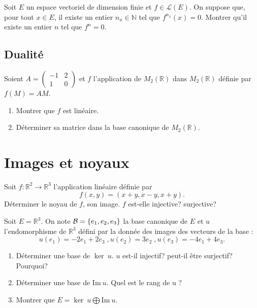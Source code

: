 \documentclass{book}
\begin{document}
\begin{Exercice}
Soit $E$ un espace vectoriel de dimension finie et $f\in\mathcal L(E)$.
On suppose que, pour tout $x\in E$, il existe un entier $n_x\in\mathbb N$ tel
que $f^{n_x}(x)=0.$ Montrer qu'il existe un entier $n$ tel que $f^n=0$.
\end{Exercice}

\subsection{Dualité}
\begin{Exercice}
Soient $A=\left(\begin{array}{cc}-1&2\\1&0\end{array}\right)$
et $f$ l'application de $M_2(\mathbb R)$ dans $M_2(\mathbb R)$
définie par $f(M)=AM$.
\begin{enumerate}
\item Montrer que $f$ est linéaire.
\item Déterminer sa matrice dans la base canonique de $M_2(\mathbb R)$.
\end{enumerate}
\end{Exercice}
\section{Images et noyaux}

\begin{Exercice}
Soit $f:\mathbb R^2\to\mathbb R^3$ l'application linéaire définie par
$$f(x,y)=(x+y,x-y,x+y).$$
Déterminer le noyau de $f$, son image. $f$ est-elle injective? surjective?
\end{Exercice}


\begin{Exercice}
Soit $E=\mathbb R^3$. On note ${\cal B}=\{e_1,e_2,e_3\}$ la base canonique de $E$ et $u$ l'endomorphisme de $\mathbb R^3$ défini par la donnée des images des vecteurs de la base : 
$$u(e_1) = -2e_1 +2e_3 \; , u(e_2)=3e_2 \; , u(e_3)=-4e_1 + 4e_3.$$ 
\begin{enumerate}
\item Déterminer une base de $\ker~u$. 
$u$ est-il injectif? peut-il être surjectif? Pourquoi?
\item Déterminer une base de $\textrm{Im}~u$. Quel est le rang de u ?
\item Montrer que $E=\ker~u\bigoplus \textrm{Im}~u$.
\end{enumerate}
\end{Exercice}
\end{document}
